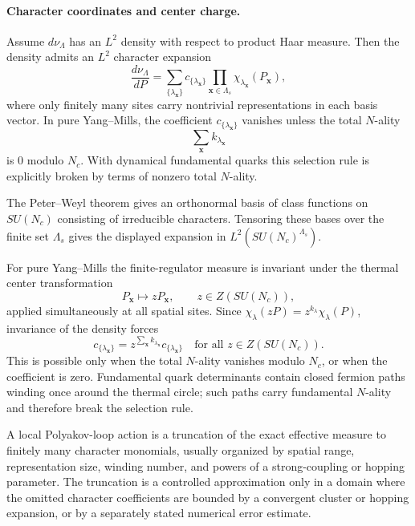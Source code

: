 \paragraph{Character coordinates and center charge.}
Assume \(d\nu_{\Lambda}\) has an \(L^2\) density with respect to product
Haar measure.  Then the density admits an \(L^2\) character expansion
\[
  \frac{d\nu_{\Lambda}}{dP}
  =
  \sum_{\{\lambda_{\mathbf x}\}}
  c_{\{\lambda_{\mathbf x}\}}
  \prod_{\mathbf x\in\Lambda_s}\chi_{\lambda_{\mathbf x}}(P_{\mathbf x}),
\]
where only finitely many sites carry nontrivial representations in each
basis vector.  In pure Yang--Mills, the coefficient
\(c_{\{\lambda_{\mathbf x}\}}\) vanishes unless the total \(N\)-ality
\[
  \sum_{\mathbf x} k_{\lambda_{\mathbf x}}
  \]
is \(0\) modulo \(N_c\).  With dynamical fundamental quarks this selection
rule is explicitly broken by terms of nonzero total \(N\)-ality.

The Peter--Weyl theorem gives an orthonormal basis of class functions on
\(SU(N_c)\) consisting of irreducible characters.  Tensoring these bases
over the finite set \(\Lambda_s\) gives the displayed expansion in
\(L^2(SU(N_c)^{\Lambda_s})\).

For pure Yang--Mills the finite-regulator measure is invariant under the
thermal center transformation
\[
  P_{\mathbf x}\mapsto zP_{\mathbf x},\qquad z\in Z(SU(N_c)),
\]
applied simultaneously at all spatial sites.  Since
\(\chi_{\lambda}(zP)=z^{k_\lambda}\chi_\lambda(P)\), invariance of the
density forces
\[
  c_{\{\lambda_{\mathbf x}\}}
  =
  z^{\sum_{\mathbf x}k_{\lambda_{\mathbf x}}}
  c_{\{\lambda_{\mathbf x}\}}
  \quad\text{for all }z\in Z(SU(N_c)).
\]
This is possible only when the total \(N\)-ality vanishes modulo \(N_c\), or
when the coefficient is zero.  Fundamental quark determinants contain
closed fermion paths winding once around the thermal circle; such paths
carry fundamental \(N\)-ality and therefore break the selection rule.

\begin{controlledapproximation}
\label{ca:qcd-local-polyakov-loop-action}
A local Polyakov-loop action is a truncation of the exact effective measure
to finitely many character monomials, usually organized by spatial range,
representation size, winding number, and powers of a strong-coupling or
hopping parameter.  The truncation is a controlled approximation only in a
domain where the omitted character coefficients are bounded by a convergent
cluster or hopping expansion, or by a separately stated numerical error
estimate.
\end{controlledapproximation}


